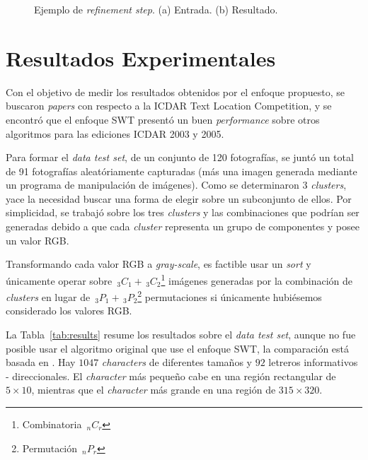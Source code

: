 \begin{figure}[h!]
  \centering
  \setlength{\fboxsep}{0pt}
	\caption[Ejemplo de \textit{refinement step}]{Ejemplo de \textit{refinement 
	step}. (a) Entrada. (b) Resultado.}
  \label{Fig:cap-resultados:refinement}
\end{figure}

\newcommand{\nPr}[2]{\,_{#1}P_{#2}} %
\newcommand{\nCr}[2]{\,_{#1}C_{#2}} %
\section{Resultados Experimentales}
Con el objetivo de medir los resultados obtenidos por el enfoque propuesto, se 
buscaron \textit{papers} con respecto a la ICDAR Text Location Competition, y se
encontró que el enfoque SWT presentó un buen \textit{performance} sobre otros
algoritmos para las ediciones ICDAR 2003 y 2005.

Para formar el \textit{data test set}, de un conjunto de 120 fotografías,
se juntó un total de 91 fotografías aleatóriamente capturadas (más una imagen 
generada mediante un programa de manipulación de imágenes). Como se determinaron 
3 \textit{clusters}, yace la necesidad buscar una forma de elegir sobre un 
subconjunto de ellos. Por simplicidad, se trabajó sobre los tres \textit{clusters}
y las combinaciones que podrían ser generadas debido a que cada \textit{cluster} 
representa un grupo de componentes y posee un valor RGB.

Transformando cada valor RGB a \textit{gray-scale}, es factible usar un 
\textit{sort} y únicamente operar sobre $\nCr{3}{1} +
\nCr{3}{2}$\footnote{Combinatoria $\nCr{n}{r}$} imágenes generadas por la
combinación de \textit{clusters} en lugar de  $\nPr{3}{1} +
\nPr{3}{2}$\footnote{Permutación $\nPr{n}{r}$} permutaciones si únicamente
hubiésemos considerado los valores RGB.

La Tabla~\ref{tab:results} resume los resultados sobre el \textit{data test
set}, aunque no fue posible usar el algoritmo original que use el enfoque SWT,
la comparación está basada en \cite{Saurav:SWT:2010}. Hay $1047$
\textit{characters} de diferentes tamaños y $92$ letreros informativos -
direccionales. El \textit{character} más pequeño cabe en una región rectangular
de $5\times 10$, mientras que el \textit{character} más grande en una región de
$315 \times 320$.

